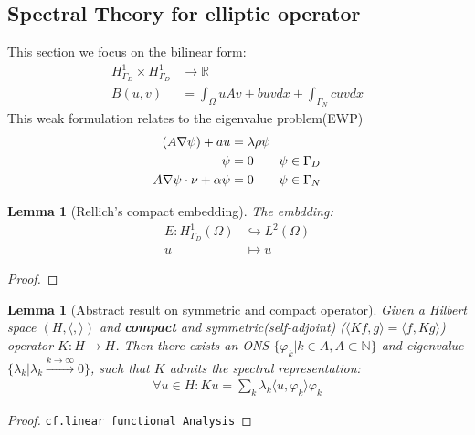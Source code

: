 \documentclass[a4paper,11pt,oneside,fleqn]{book}
\newtheorem{lemma}[theorem]{Lemma}
\theoremstyle{definition}
\theoremstyle{remark}
\let\div\relax
\DeclareMathOperator{\div}{div}
\begin{document}
\subsection{Spectral Theory for elliptic operator}
This section we focus on the bilinear form:
\begin{align*}
	H^1_{\Gamma_D} \times H^1_{\Gamma_D} &\rightarrow \mathbb{R} \\
	B(u, v) &= \int_\Omega u A v + buv dx + \int_{\Gamma_N} c uv dx
\end{align*}
This weak formulation relates to the eigenvalue problem(EWP)
\begin{align*}
	\div(A \nabla\psi) + au &= \lambda \rho \psi \\
	\psi &= 0 \qquad  \psi \in \Gamma_D\\
	A \nabla \psi \cdot \nu + \alpha \psi &= 0 \qquad \psi \in \Gamma_N
\end{align*}

\begin{lemma}[Rellich's compact embedding]
	The embdding:
	\begin{align*}
		E: H^1_{\Gamma_D}(\Omega) &\hookrightarrow L^2(\Omega)\\
			u &\mapsto u
	\end{align*}
\end{lemma}
\begin{proof}
\end{proof}

\begin{lemma}[Abstract result on symmetric and compact operator]
	Given a Hilbert space $(H, \langle , \rangle)$ and \textbf{compact} and symmetric(self-adjoint) ($\langle Kf, g \rangle = \langle f, Kg   \rangle$) operator $K: H \rightarrow H$. Then there exists an ONS $\{ \varphi_k | k \in A, A \subset \mathbb{N}\}$ and eigenvalue $\{\lambda_k | \lambda_k \overset{k \rightarrow \infty}{\rightarrow} 0\}$, such that $K$ admits the spectral representation:
	\begin{align*}
		\forall u \in H: Ku = \sum_{k} \lambda_k \langle u, \varphi_k\rangle \varphi_k
	\end{align*}
\end{lemma}
\begin{proof}
	\texttt{cf.linear functional Analysis}
\end{proof}
\end{document}

